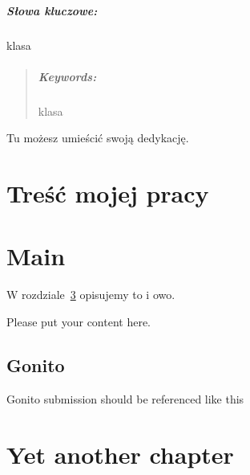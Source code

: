 \documentclass[oneside,polski,logo]{amuthesis}
\date{Poznań, grudzień 2020}
\begin{document}
\maketitle
\makestatement

\begin{streszczenie}
\lipsum[1]

\paragraph{Słowa kluczowe:} klasa
\end{streszczenie}

\begin{abstract}
\lipsum[2]

\paragraph{Keywords:} klasa
\end{abstract}

\begin{dedykacja}
Tu możesz umieścić swoją dedykację.
\end{dedykacja}

\tableofcontents


\chapter{Treść mojej pracy}

\lipsum[3]

\chapter{Main}

W rozdziale~\ref{chapSource} opisujemy to i owo.


Please put your content here.



\section{Gonito}


Gonito submission should be referenced like this


\chapter{Yet another chapter}\label{chapSource}
\end{document}
